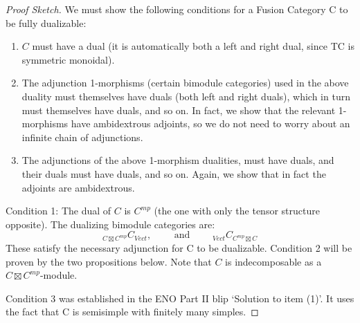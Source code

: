 \documentclass{amsart}
\begin{document}
\begin{proof}[Proof Sketch]
We must show the following conditions for a Fusion Category C to be fully dualizable: 
	\begin{enumerate}
		\item $C$ must have a dual (it is automatically both a left and right dual, since TC is symmetric monoidal).
		\item The adjunction 1-morphisms (certain bimodule categories) used in the above duality must themselves have duals (both left and right duals), which in turn must themselves have duals, and so on.  In fact, we show that the relevant 1-morphisms have ambidextrous adjoints, so we do not need to worry about an infinite chain of adjunctions.
		\item The adjunctions of the above 1-morphism dualities, must have duals, and their duals must have duals, and so on.  Again, we show that in fact the adjoints are ambidextrous.
	\end{enumerate}

Condition 1: The dual of $C$ is $C^{mp}$ (the one with only the tensor structure opposite). The dualizing bimodule categories are:
\begin{equation*}
	{}_{C \boxtimes C^{mp}} C_{Vect}, \qquad \text{ and } \qquad {}_{Vect} C_{C^{mp} \boxtimes C}	
\end{equation*} 
These satisfy the necessary adjunction for C to be dualizable. 
Condition 2 will be proven by the two propositions below. Note that $C$ is indecomposable as a $C \boxtimes C^{mp}$-module.  
	
Condition 3 was established in the ENO Part II blip `Solution to item (1)'.  It uses the fact that C is semisimple with finitely many simples. 	
	
\end{proof}	
	
\end{document}
